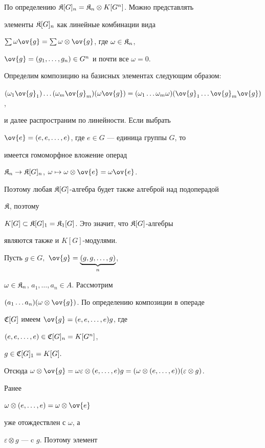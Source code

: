\begin{pf}


По определению $\frak K[G]_n=\frak K_n\otimes K[G^n]$. Можно представлять


элементы $\frak K[G]_n$ как линейные комбинации вида


$\sum\omega\ov{g}=\sum\omega\otimes\ov{g}$, где $\omega\in \frak K_n$,


$\ov{g}=(g_1,\dotsc,g_n)\in G^n$ и почти все $\omega=0$.


Определим композицию на базисных элементах следующим образом:


$(\omega_1\ov{g}_1)\dotsc (\omega_m\ov{g}_m)(\omega\ov{g})=


(\omega_1\dotsc \omega_m\omega)(\ov{g}_1\dotsc \ov{g}_m\ov{g})$,


и далее распространим по линейности. Если выбрать


$\ov{e}=(e, e,\dotsc,e)$, где $e\in G$ --- единица группы $G$, то


имеется гомоморфное вложение операд


$\frak K_n\to \frak K[G]_n$, $\omega\mapsto\omega\otimes\ov{e}=\omega\ov{e}$.


Поэтому любая $\frak K[G]$-алгебра будет также алгеброй над подоперадой


$\frak K$, поэтому


$K[G]\subset \frak K[G]_1=\frak K_1[G]$. Это значит, что $\frak K[G]$-алгебры


являются также и $K[G]$-модулями.


Пусть $g\in G,$ $\ov{g}=\underbrace{(g,g,\dotsc,g)}_{n}$,


$\omega\in \frak K_n$, $a_1,\dotsc,a_n\in A$. Рассмотрим


$(a_1\dotsc a_n)(\omega\otimes \ov{g})$. По определению композиции в операде


$\frak C [G]$ имеем $\ov{g}=(e,e,\dotsc,e)g$, где


$(e,e,\dotsc,e)\in\frak C [G]_n=K[G^n]$,


$g\in \frak C [G]_1=K[G].$


Отсюда $\omega\otimes\ov{g}=\omega\varepsilon\otimes (e,\dotsc,e)g=


(\omega\otimes(e,\dotsc,e))(\varepsilon\otimes g)$.


Ранее


$\omega\otimes (e,\dotsc,e)=\omega\otimes \ov{e}$


уже отождествлен с $\omega$, а


$\varepsilon\otimes g$ --- c $g$. Поэтому элемент



\end{pf}
